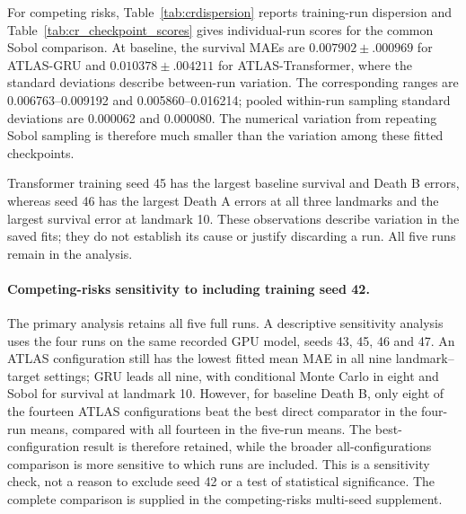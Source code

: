 


For competing risks, Table~\ref{tab:crdispersion} reports training-run dispersion and Table~\ref{tab:cr_checkpoint_scores} gives individual-run scores for the common Sobol comparison. At baseline, the survival MAEs are $0.007902\pm.000969$ for ATLAS-GRU and $0.010378\pm.004211$ for ATLAS-Transformer, where the standard deviations describe between-run variation. The corresponding ranges are 0.006763--0.009192 and 0.005860--0.016214; pooled within-run sampling standard deviations are 0.000062 and 0.000080. The numerical variation from repeating Sobol sampling is therefore much smaller than the variation among these fitted checkpoints.

Transformer training seed 45 has the largest baseline survival and Death B errors, whereas seed 46 has the largest Death A errors at all three landmarks and the largest survival error at landmark 10. These observations describe variation in the saved fits; they do not establish its cause or justify discarding a run. All five runs remain in the analysis.





\paragraph{Competing-risks sensitivity to including training seed 42.} The primary analysis retains all five full runs. A descriptive sensitivity analysis uses the four runs on the same recorded GPU model, seeds 43, 45, 46 and 47. An ATLAS configuration still has the lowest fitted mean MAE in all nine landmark--target settings; GRU leads all nine, with conditional Monte Carlo in eight and Sobol for survival at landmark 10. However, for baseline Death B, only eight of the fourteen ATLAS configurations beat the best direct comparator in the four-run means, compared with all fourteen in the five-run means. The best-configuration result is therefore retained, while the broader all-configurations comparison is more sensitive to which runs are included. This is a sensitivity check, not a reason to exclude seed 42 or a test of statistical significance. The complete comparison is supplied in the competing-risks multi-seed supplement.
